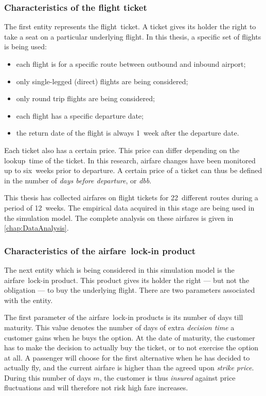 \subsubsection{Characteristics of the flight ticket}
\label{sub:CharacteristicsOfTheFlightTicket}
The first entity represents the flight~ticket. A ticket gives its holder the right to take a seat on a particular underlying flight. In this thesis, a specific set of flights is being used:

\begin{itemize}
\item each flight is for a specific route between outbound and inbound airport;
\item only single-legged (direct) flights are being considered;
\item only round trip flights are being considered;
\item each flight has a specific departure date;
\item the return date of the flight is always 1~week after the departure date.
\end{itemize}

Each ticket also has a certain price. This price can differ depending on the lookup~time of the ticket. In this research, airfare changes have been monitored up to six~weeks prior to departure. A certain price of a ticket can thus be defined in the number of \emph{days before departure}, or \emph{dbb}.

This thesis has collected airfares on flight tickets for 22~different routes during a period of 12~weeks. The empirical data acquired in this stage are being used in the simulation model. The complete analysis on these airfares is given in \autoref{chap:DataAnalysis}.

\subsubsection{Characteristics of the airfare~lock-in product}
The next entity which is being considered in this simulation model is the airfare~lock-in product. This product gives its holder the right --- but not the obligation --- to buy the underlying flight. There are two parameters associated with the entity.

The first parameter of the airfare~lock-in products is its number of days till maturity. This value denotes the number of days of extra \emph{decision time} a customer gains when he buys the option. At the date of maturity, the customer has to make the decision to actually buy the ticket, or to not exercise the option at all. A passenger will choose for the first alternative when he has decided to actually fly, and the current airfare is higher than the agreed upon \emph{strike price}. During this number of days $m$, the customer is thus \emph{insured} against price fluctuations and will therefore not risk high fare increases.

